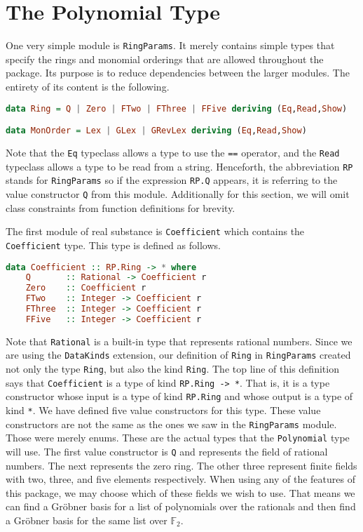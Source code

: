 \documentclass[MS, xcolor=dvipsnames]{wfuthesis}
\def\bF{\mathbb{F}}
\theoremstyle{definition}
\begin{document}
\section{The Polynomial Type}
One very simple module is \lstinline{RingParams}. It merely contains simple types that specify the rings and monomial orderings that are allowed throughout the package. Its purpose is to reduce dependencies between the larger modules. The entirety of its content is the following.
\begin{lstlisting}[language=Haskell]
data Ring = Q | Zero | FTwo | FThree | FFive deriving (Eq,Read,Show)

data MonOrder = Lex | GLex | GRevLex deriving (Eq,Read,Show)
\end{lstlisting}
Note that the \lstinline{Eq} typeclass allows a type to use the \lstinline{==} operator, and the \lstinline{Read} typeclass allows a type to be read from a string. Henceforth, the abbreviation \lstinline{RP} stands for \lstinline{RingParams} so if the expression \lstinline{RP.Q} appears, it is referring to the value constructor \lstinline{Q} from this module. Additionally for this section, we will omit class constraints from function definitions for brevity. \par
The first module of real substance is \lstinline{Coefficient} which contains the \lstinline{Coefficient} type. This type is defined as follows.
\begin{lstlisting}[language=Haskell]
data Coefficient :: RP.Ring -> * where
    Q       :: Rational -> Coefficient r
    Zero    :: Coefficient r
    FTwo    :: Integer -> Coefficient r
    FThree  :: Integer -> Coefficient r
    FFive   :: Integer -> Coefficient r
\end{lstlisting}
Note that \lstinline{Rational} is a built-in type that represents rational numbers. Since we are using the \lstinline{DataKinds} extension, our definition of \lstinline{Ring} in \lstinline{RingParams} created not only the type \lstinline{Ring}, but also the kind \lstinline{Ring}. The top line of this definition says that \lstinline{Coefficient} is a type of kind \lstinline{RP.Ring -> *}. That is, it is a type constructor whose input is a type of kind \lstinline{RP.Ring} and whose output is a type of kind \lstinline{*}. We have defined five value constructors for this type. These value constructors are not the same as the ones we saw in the \lstinline{RingParams} module. Those were merely enums. These are the actual types that the \lstinline{Polynomial} type will use. The first value constructor is \lstinline{Q} and represents the field of rational numbers. The next represents the zero ring. The other three represent finite fields with two, three, and five elements respectively. When using any of the features of this package, we may choose which of these fields we wish to use. That means we can find a Gr\"obner basis for a list of polynomials over the rationals and then find a Gr\"obner basis for the same list over $\bF_2$. \par
\end{document}
